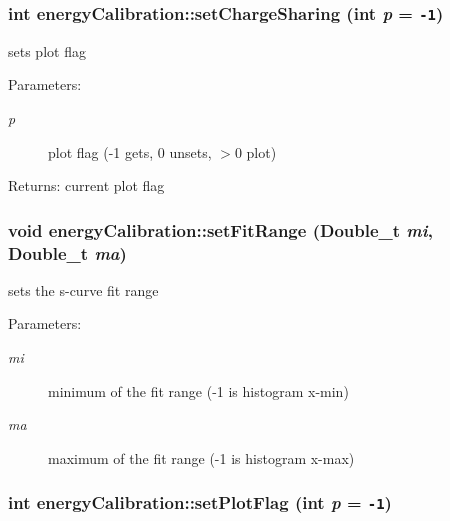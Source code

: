 \subsubsection{\setlength{\rightskip}{0pt plus 5cm}int energy\-Calibration::set\-Charge\-Sharing (int {\em p} = {\tt -1})}\label{classenergyCalibration_e2809b419799e8b199944f185d4ebab8}


sets plot flag \begin{Desc}
\item[Parameters:]
\begin{description}
\item[{\em p}]plot flag (-1 gets, 0 unsets, $>$0 plot) \end{description}
\end{Desc}
\begin{Desc}
\item[Returns:]current plot flag \end{Desc}
\subsubsection{\setlength{\rightskip}{0pt plus 5cm}void energy\-Calibration::set\-Fit\-Range (Double\_\-t {\em mi}, Double\_\-t {\em ma})\hspace{0.3cm}{\tt  [inline]}}\label{classenergyCalibration_695cef5428a833d515172d987774f67b}


sets the s-curve fit range \begin{Desc}
\item[Parameters:]
\begin{description}
\item[{\em mi}]minimum of the fit range (-1 is histogram x-min) \item[{\em ma}]maximum of the fit range (-1 is histogram x-max) \end{description}
\end{Desc}
\subsubsection{\setlength{\rightskip}{0pt plus 5cm}int energy\-Calibration::set\-Plot\-Flag (int {\em p} = {\tt -1})\hspace{0.3cm}{\tt  [inline]}}\label{classenergyCalibration_3d9af0857f7a68b7e4519917ea97e6be}


